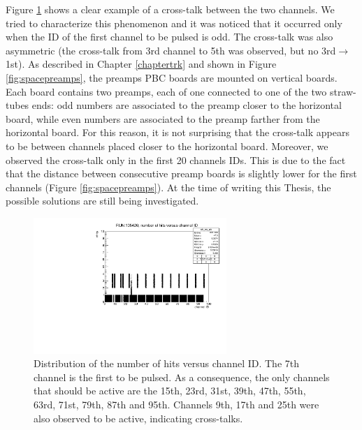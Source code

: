 Figure \ref{fig:cross} shows a clear example of 
a cross-talk between the two channels. 
We tried to characterize this phenomenon and it was  
noticed that it occurred 
only when the ID of the first channel to be 
pulsed is odd.
The cross-talk was also asymmetric 
(the cross-talk from 3rd channel to 5th was observed, 
but no 3rd$\rightarrow$1st).
As described in Chapter \ref{chaptertrk} 
and shown in Figure \ref{fig:spacepreamps}, 
the preamps PBC boards are mounted on vertical 
boards. Each board contains two preamps, each of one 
connected to one of the two straw-tubes ends: odd numbers 
are associated to the preamp closer to the horizontal 
board, while even numbers are associated to 
the preamp farther from the horizontal board. For this 
reason, it is not surprising that the cross-talk 
appears to be between channels placed closer to 
the horizontal board. 
Moreover, we observed the cross-talk 
only in the first 20 channels IDs.
This is due to the fact that the 
distance between consecutive preamp 
boards is slightly lower for the 
first channels (Figure \ref{fig:spacepreamps}).
At the time of writing this Thesis, the 
possible solutions are still being investigated. 
\begin{figure}[!h]
  \centering
  \includegraphics[width=0.65\textwidth]{figures/pdf/run105420_nh_vs_ch.pdf}
  \caption[The occupancy plot and cross-talks.]{Distribution of the number of hits versus channel ID. The 7th channel is the first to be pulsed. 
  As a consequence, the only channels that should be active are the 15th, 23rd, 31st, 39th, 47th, 55th, 63rd, 71st, 79th, 87th and 95th. 
  Channels 9th, 17th and 25th were also observed to be active, indicating cross-talks.}
 \label{fig:cross}
\end{figure}

